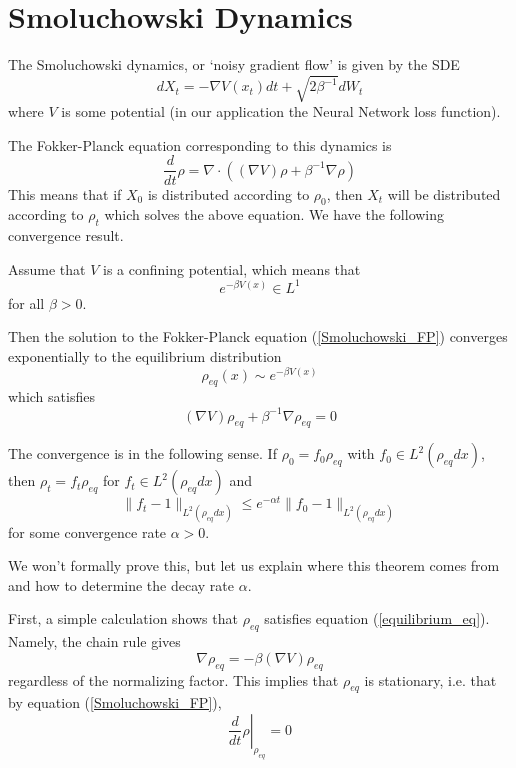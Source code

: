 \section{Smoluchowski Dynamics}
The Smoluchowski dynamics, or `noisy gradient flow' is given by the SDE
\begin{equation}\label{Smoluchowski}
 dX_t = -\nabla V(x_t)dt + \sqrt{2\beta^{-1}} dW_t
\end{equation}
where $V$ is some potential (in our application the Neural Network loss function).

The Fokker-Planck equation corresponding to this dynamics is
\begin{equation}\label{Smoluchowski_FP}
 \frac{d}{dt}\rho = \nabla \cdot ((\nabla V)\rho + \beta^{-1}\nabla \rho)
\end{equation}
This means that if $X_0$ is distributed according to $\rho_0$, then $X_t$ will be distributed
according to $\rho_t$ which solves the above equation. We have the following convergence result.
\begin{theorem}

 Assume that $V$ is a confining potential, which means that $$e^{-\beta V(x)}\in L^1$$
 for all $\beta > 0$. 
 
 Then
 the solution to the Fokker-Planck equation (\ref{Smoluchowski_FP}) converges exponentially to the
 equilibrium distribution
 \begin{equation}\label{equilibrium_dist}
 \rho_{eq}(x) \sim e^{-\beta V(x)}
 \end{equation}
 which satisfies
 \begin{equation}\label{equilibrium_eq}
 (\nabla V)\rho_{eq} + \beta^{-1}\nabla \rho_{eq} = 0
 \end{equation}
 
 The convergence is in the following sense. If $\rho_0 = f_0\rho_{eq}$ with $f_0\in L^2(\rho_{eq}dx)$,
 then $\rho_t = f_t\rho_{eq}$ for $f_t\in L^2(\rho_{eq}dx)$ and 
 \begin{equation}\label{decay_rate}
  \|f_t - 1\|_{L^2(\rho_{eq}dx)} \leq e^{-\alpha t}\|f_0 - 1\|_{L^2(\rho_{eq}dx)}
 \end{equation}
 for some convergence rate $\alpha > 0$.
\end{theorem}

We won't formally prove this, but let us explain where this theorem comes from and how to determine the decay rate
$\alpha$.

First, a simple calculation shows that $\rho_{eq}$ satisfies equation (\ref{equilibrium_eq}). Namely, the chain rule gives
$$\nabla \rho_{eq} = -\beta (\nabla V)\rho_{eq}$$
regardless of the normalizing factor. This implies that $\rho_{eq}$ is stationary, i.e. that by equation (\ref{Smoluchowski_FP}),
$$\left.\frac{d}{dt}\rho\right|_{\rho_{eq}} = 0$$

